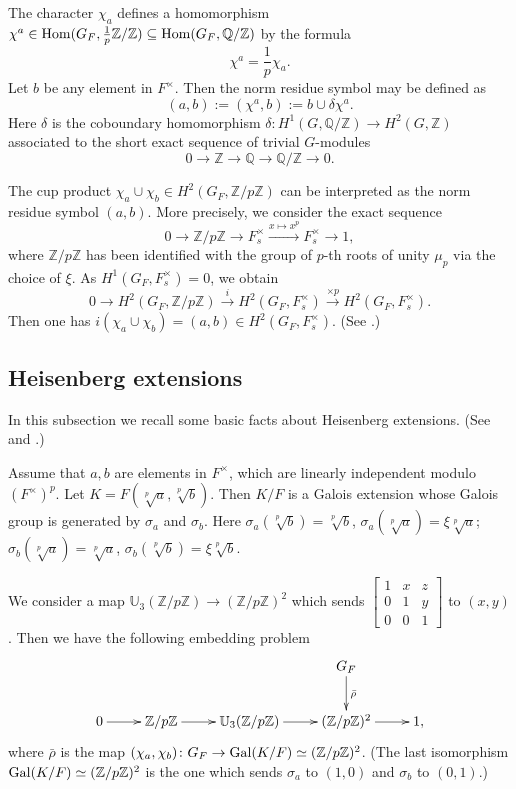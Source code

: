 \documentclass[12pt,leqno]{amsart}
\theoremstyle{plain}
\theoremstyle{definition}
\newcommand{\Q}{{\mathbb Q}}
\newcommand{\U}{{\mathbb U}}
\newcommand{\Z}{{\mathbb Z}}
\begin{document}
The character $\chi_a$ defines a homomorphism $\chi^a\in {\rm Hom}(G_F,\frac{1}p\Z/\Z)\subseteq {\rm Hom}(G_F,\Q/\Z)$ by the formula
\[
\chi^a =\frac{1}{p} \chi_a. 
\]
Let $b$ be any element in $F^\times$.  Then the norm residue symbol may be defined as
\[
(a,b):= (\chi^a,b):= b\cup \delta \chi^a.
\]
Here $\delta$ is the coboundary homomorphism $\delta \colon H^1(G,\Q/\Z)\to H^2(G,\Z)$ associated to the short exact sequence of trivial $G$-modules
\[
0\to \Z\to \Q\to \Q/\Z\to 0.
\]

The cup product $\chi_a\cup \chi_b\in H^2(G_F,\Z/p\Z)$ can be interpreted as the norm residue symbol $(a,b)$. More precisely, we consider the exact sequence
\[
0\longrightarrow \Z/p\Z \longrightarrow  F_s^\times \stackrel{x\mapsto x^p}{\longrightarrow} F_s^\times \longrightarrow 1,
\]
where $\Z/p\Z$ has been identified with the group of $p$-th roots of unity $\mu_p$ via the choice of $\xi$. As $H^1(G_F,F_s^\times)=0$, we obtain
\[
0{\longrightarrow} H^2(G_F,\Z/p\Z)\stackrel{i}{\longrightarrow} H^2(G_F,F_s^\times) \stackrel{\times p}{\longrightarrow} H^2(G_F,F_s^\times).
\]
Then one has $i(\chi_a\cup \chi_b)=(a,b)\in H^2(G_F,F_s^\times)$. (See \cite[Chapter XIV, Proposition 5]{Se}.) 
\subsection{Heisenberg extensions}
\label{subsec:Heisenberg}
In this subsection we recall some basic facts about Heisenberg extensions. (See \cite[Chapter 2, Section 2.4]{Sha} and \cite[Sections 6.5 and 6.6 ]{JLY}.)
 
Assume that $a,b$ are elements in $F^\times$, which are linearly independent modulo $(F^\times)^p$. Let $K= F(\sqrt[p]{a},\sqrt[p]{b})$. Then $K/F$ is a Galois extension whose Galois group is generated by $\sigma_a$ and $\sigma_b$. Here $\sigma_a(\sqrt[p]{b})=\sqrt[p]{b}$, $\sigma_a(\sqrt[p]{a})=\xi \sqrt[p]{a}$; $\sigma_b(\sqrt[p]{a})=\sqrt[p]{a}$, $\sigma_b(\sqrt[p]{b})=\xi \sqrt[p]{b}$. 

We consider a map $\U_3(\Z/p\Z)\to (\Z/p\Z)^2$ which sends $\begin{bmatrix} 
1 & x & z\\
0 & 1 & y\\
0 & 0 & 1 
\end{bmatrix}$
to $(x,y)$. Then we have the following embedding problem
\[
 \xymatrix{
& & &G_F \ar@{->}[d]^{\bar\rho} \\
0\ar[r]& \Z/p\Z \ar[r] &\U_3(\Z/p\Z)\ar[r] &(\Z/p\Z)^2\ar[r] &1,
}
\]
where $\bar\rho$ is the map $(\chi_a,\chi_b)\colon G_F\to {\rm Gal}(K/F)\simeq (\Z/p\Z)^2$. (The last isomorphism ${\rm Gal}(K/F)\simeq (\Z/p\Z)^2$ is the one which sends $\sigma_a$ to $(1,0)$ and $\sigma_b$ to $(0,1)$.)
\end{document}

